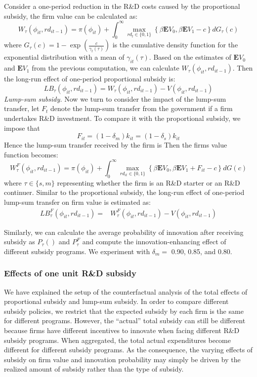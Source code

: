 \documentclass[11pt]{article}
\begin{document}
Consider a one-period reduction in the R\&D costs caused by the proportional subsidy, the firm value can be calculated as:
\begin{equation}\label{wz}  
W_{\tau}(\phi_{it}, rd_{it-1})=\pi(\phi_{it})+ \int_0^{\infty}\max_{rd_t\in\{0,1\}}\left\{\beta \mathbf{E}V_{0},  \beta \mathbf{E}V_{1}-c\right\}dG_\tau(c)
\end{equation}
where $G_\tau(c)=1-\exp(\frac{c}{\gamma _t(\tau)})$ is the cumulative density function for the exponential distribution with a mean of $\gamma_{it}(\tau)$. Based on the estimates of $\mathbf{E}V_{0}$ and  $\mathbf{E}V_1$ from the previous computation, we can calculate $W_{\tau}(\phi_{it}, rd_{it-1})$. Then the long-run effect of one-period proportional subsidy is:
\begin{equation}
    LB_{\tau}(\phi_{it}, rd_{it-1})=W_\tau(\phi_{it}, rd_{it-1})-V(\phi_{it}, rd_{it-1})
\end{equation}
\textit{Lump-sum subsidy.} Now we turn to consider the impact of the lump-sum transfer, let $F_t$ denote the lump-sum transfer from the government if a firm undertakes R\&D investment. To compare it with the proportional subsidy, we impose that 
\[
  F_{it} = (1-\delta_m)k_{it} = (1-\delta_s)k_{it}
\]
Hence the lump-sum transfer received by the firm is 
Then the firms value function becomes:
\begin{equation}\label{wzf}
W_{\tau}^F(\phi_{it}, rd_{it-1})=\pi(\phi_{it})+ \int_0^{\infty}\max_{rd_{it}\in\{0,1\}}\left\{\beta \mathbf{E}V_{0},  \beta \mathbf{E}V_{1}+F_{it}-c\right\}dG(c)
\end{equation}
where $\tau \in \{s, m\}$ representing whether the firm is an R\&D starter or an R\&D continuer. Similar to the proportional subsidy, the long-run effect of one-period lump-sum transfer on firm value is estimated as:
\begin{align}\label{longsub1}
LB_{\tau}^F(\phi_{it}, rd_{it-1})=& W_\tau^F(\phi_{it}, rd_{it-1})-V(\phi_{it}, rd_{it-1})
\end{align}

Similarly, we can calculate the average probability of innovation after receiving subsidy as $P_\tau()$ and $P^F_\tau$ and compute the innovation-enhancing effect of different subsidy programs. We experiment with $\delta_m=$  0.90, 0.85, and 0.80. 


\subsubsection{Effects of one unit R\&D subsidy} 
We have explained the setup of the counterfactual analysis of the total effects of proportional subsidy and lump-sum subsidy. In order to compare different subsidy policies, we restrict that the expected subsidy by each firm is the same for different programs. However, the ``actual'' total subsidy can still be different because firms have different incentives to innovate when facing different R\&D subsidy programs.  When aggregated, the total actual expenditures become different for different subsidy programs. As the consequence, the varying effects of subsidy on firm value and innovation probability may simply be driven by the realized amount of subsidy rather than the type of subsidy. 
\end{document}
